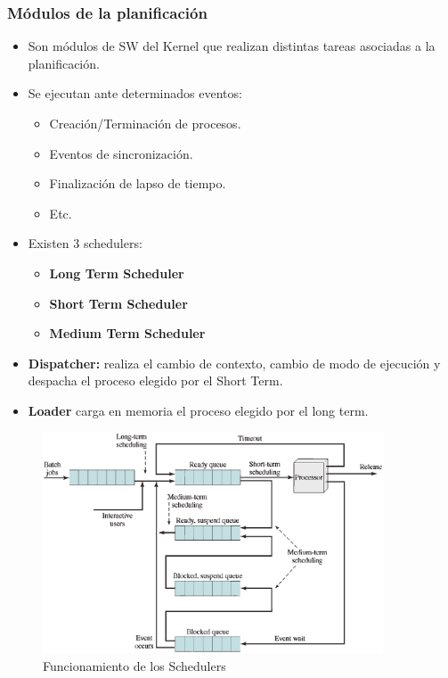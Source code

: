 \subsubsection{Módulos de la planificación}
\begin{itemize}
    \item Son módulos de SW del Kernel que realizan distintas tareas asociadas a la planificación.
    \item Se ejecutan ante determinados eventos:
    \begin{itemize}
        \item Creación/Terminación de procesos.
        \item Eventos de sincronización.
        \item Finalización de lapso de tiempo.
        \item Etc.
    \end{itemize}
    \item Existen 3 schedulers:
        \begin{itemize}
            \item \textbf{Long Term Scheduler} 
            \item \textbf{Short Term Scheduler} 
            \item \textbf{Medium Term Scheduler} 
        \end{itemize}
    \item \textbf{Dispatcher:} realiza el cambio de contexto, cambio de modo de ejecución y despacha el proceso elegido por el Short Term.
    \item \textbf{Loader} carga en memoria el proceso elegido por el long term.
\end{itemize}
\pagebreak
\begin{figure}[h]
    \begin{center}
        \includegraphics[width=0.90\textwidth]{assets/Schedulers.eps}
    \end{center}
    \caption{Funcionamiento de los Schedulers}\label{fig:}
\end{figure}


